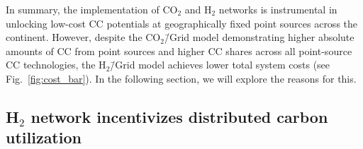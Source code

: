 \documentclass[twocolumn]{article}
\newcommand{\COtwo}{CO$_2$}
\newcommand{\Htwo}{H$_2$}
\newcommand{\modBase}{Baseline model}
\newcommand{\modCO}{CO$_2$\=/Grid model}
\newcommand{\modH}{H$_2$\=/Grid model}
\begin{document}
In summary, the implementation of \COtwo{} and \Htwo{} networks is instrumental in unlocking low-cost CC potentials at geographically fixed point sources across the continent. However, despite the \modCO{} demonstrating higher absolute amounts of CC from point sources and higher CC shares across all point-source CC technologies, the \modH{} achieves lower total system costs (see Fig.~\ref{fig:cost_bar}). In the following section, we will explore the reasons for this.






\subsection*{\Htwo{} network incentivizes distributed carbon utilization}\label{subsec:H2}
\end{document}
